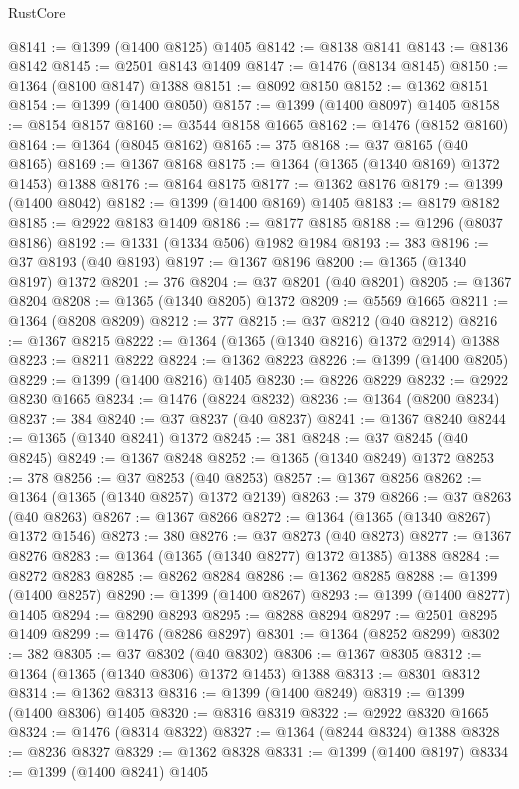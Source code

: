 \begin{lexlean}{RustCore}
\begin{coremodule}
@8141 := @1399 (@1400 @8125) @1405
@8142 := @8138 @8141
@8143 := @8136 @8142
@8145 := @2501 @8143 @1409
@8147 := @1476 (@8134 @8145)
@8150 := @1364 (@8100 @8147) @1388
@8151 := @8092 @8150
@8152 := @1362 @8151
@8154 := @1399 (@1400 @8050)
@8157 := @1399 (@1400 @8097) @1405
@8158 := @8154 @8157
@8160 := @3544 @8158 @1665
@8162 := @1476 (@8152 @8160)
@8164 := @1364 (@8045 @8162)
@8165 := 375
@8168 := @37 @8165 (@40 @8165)
@8169 := @1367 @8168
@8175 := @1364 (@1365 (@1340 @8169) @1372 @1453) @1388
@8176 := @8164 @8175
@8177 := @1362 @8176
@8179 := @1399 (@1400 @8042)
@8182 := @1399 (@1400 @8169) @1405
@8183 := @8179 @8182
@8185 := @2922 @8183 @1409
@8186 := @8177 @8185
@8188 := @1296 (@8037 @8186)
@8192 := @1331 (@1334 @506) @1982 @1984
@8193 := 383
@8196 := @37 @8193 (@40 @8193)
@8197 := @1367 @8196
@8200 := @1365 (@1340 @8197) @1372
@8201 := 376
@8204 := @37 @8201 (@40 @8201)
@8205 := @1367 @8204
@8208 := @1365 (@1340 @8205) @1372
@8209 := @5569 @1665
@8211 := @1364 (@8208 @8209)
@8212 := 377
@8215 := @37 @8212 (@40 @8212)
@8216 := @1367 @8215
@8222 := @1364 (@1365 (@1340 @8216) @1372 @2914) @1388
@8223 := @8211 @8222
@8224 := @1362 @8223
@8226 := @1399 (@1400 @8205)
@8229 := @1399 (@1400 @8216) @1405
@8230 := @8226 @8229
@8232 := @2922 @8230 @1665
@8234 := @1476 (@8224 @8232)
@8236 := @1364 (@8200 @8234)
@8237 := 384
@8240 := @37 @8237 (@40 @8237)
@8241 := @1367 @8240
@8244 := @1365 (@1340 @8241) @1372
@8245 := 381
@8248 := @37 @8245 (@40 @8245)
@8249 := @1367 @8248
@8252 := @1365 (@1340 @8249) @1372
@8253 := 378
@8256 := @37 @8253 (@40 @8253)
@8257 := @1367 @8256
@8262 := @1364 (@1365 (@1340 @8257) @1372 @2139)
@8263 := 379
@8266 := @37 @8263 (@40 @8263)
@8267 := @1367 @8266
@8272 := @1364 (@1365 (@1340 @8267) @1372 @1546)
@8273 := 380
@8276 := @37 @8273 (@40 @8273)
@8277 := @1367 @8276
@8283 := @1364 (@1365 (@1340 @8277) @1372 @1385) @1388
@8284 := @8272 @8283
@8285 := @8262 @8284
@8286 := @1362 @8285
@8288 := @1399 (@1400 @8257)
@8290 := @1399 (@1400 @8267)
@8293 := @1399 (@1400 @8277) @1405
@8294 := @8290 @8293
@8295 := @8288 @8294
@8297 := @2501 @8295 @1409
@8299 := @1476 (@8286 @8297)
@8301 := @1364 (@8252 @8299)
@8302 := 382
@8305 := @37 @8302 (@40 @8302)
@8306 := @1367 @8305
@8312 := @1364 (@1365 (@1340 @8306) @1372 @1453) @1388
@8313 := @8301 @8312
@8314 := @1362 @8313
@8316 := @1399 (@1400 @8249)
@8319 := @1399 (@1400 @8306) @1405
@8320 := @8316 @8319
@8322 := @2922 @8320 @1665
@8324 := @1476 (@8314 @8322)
@8327 := @1364 (@8244 @8324) @1388
@8328 := @8236 @8327
@8329 := @1362 @8328
@8331 := @1399 (@1400 @8197)
@8334 := @1399 (@1400 @8241) @1405

\end{coremodule}
\end{lexlean}
